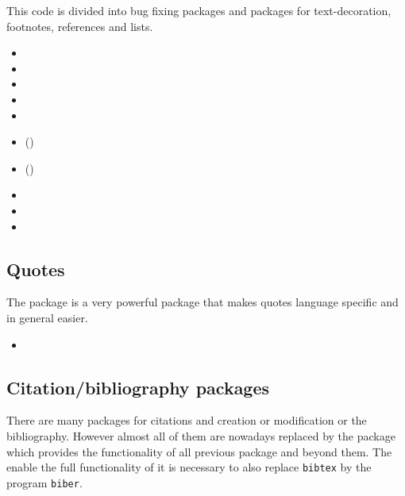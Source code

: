 This code is divided into bug fixing packages and packages for text-decoration, footnotes, references and lists.

\begin{itemize}[noitemsep]
\item {}
\item {}
\item {}
\item {}
\item {}
\item ()
\item ()
\item {}
\item {}
\item {}
\end{itemize}


\subsection{Quotes}

The package  is a very powerful package that makes quotes language specific and in general easier.

\begin{itemize}[noitemsep]
\item {}
\end{itemize}


\subsection{Citation/bibliography packages}
\label{sec:preamble:bibliography}
There are many packages for citations and creation or modification or the bibliography. However almost all of them are nowadays replaced by the package 
 which provides the functionality of all previous package and beyond them. The enable the full functionality of  it is necessary to also replace \texttt{bibtex} by the program \texttt{biber}.

